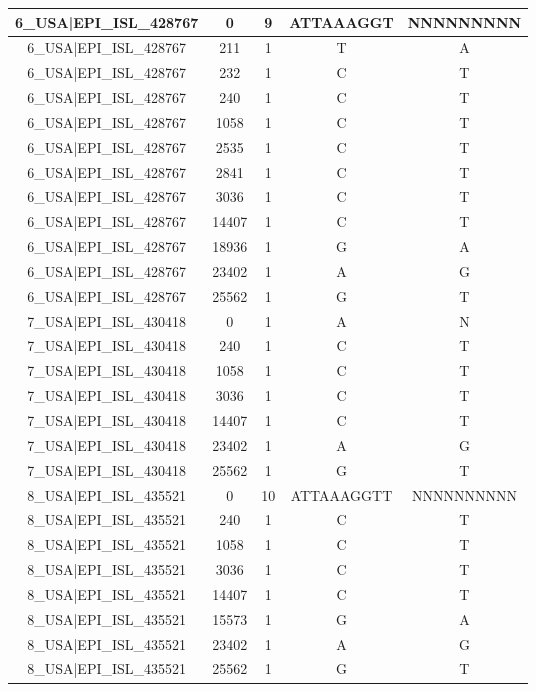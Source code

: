 \documentclass[a4paper,10pt]{article}
\begin{document}
\begin{longtable}{@{}ccccc@{}}
6\_USA|EPI\_ISL\_428767 & 0 & 9 & ATTAAAGGT & NNNNNNNNN \\* \midrule
6\_USA|EPI\_ISL\_428767 & 211 & 1 & T & A \\* \midrule
6\_USA|EPI\_ISL\_428767 & 232 & 1 & C & T \\* \midrule
6\_USA|EPI\_ISL\_428767 & 240 & 1 & C & T \\* \midrule
6\_USA|EPI\_ISL\_428767 & 1058 & 1 & C & T \\* \midrule
6\_USA|EPI\_ISL\_428767 & 2535 & 1 & C & T \\* \midrule
6\_USA|EPI\_ISL\_428767 & 2841 & 1 & C & T \\* \midrule
6\_USA|EPI\_ISL\_428767 & 3036 & 1 & C & T \\* \midrule
6\_USA|EPI\_ISL\_428767 & 14407 & 1 & C & T \\* \midrule
6\_USA|EPI\_ISL\_428767 & 18936 & 1 & G & A \\* \midrule
6\_USA|EPI\_ISL\_428767 & 23402 & 1 & A & G \\* \midrule
6\_USA|EPI\_ISL\_428767 & 25562 & 1 & G & T \\* \midrule
7\_USA|EPI\_ISL\_430418 & 0 & 1 & A & N \\* \midrule
7\_USA|EPI\_ISL\_430418 & 240 & 1 & C & T \\* \midrule
7\_USA|EPI\_ISL\_430418 & 1058 & 1 & C & T \\* \midrule
7\_USA|EPI\_ISL\_430418 & 3036 & 1 & C & T \\* \midrule
7\_USA|EPI\_ISL\_430418 & 14407 & 1 & C & T \\* \midrule
7\_USA|EPI\_ISL\_430418 & 23402 & 1 & A & G \\* \midrule
7\_USA|EPI\_ISL\_430418 & 25562 & 1 & G & T \\* \midrule
8\_USA|EPI\_ISL\_435521 & 0 & 10 & ATTAAAGGTT & NNNNNNNNNN \\* \midrule
8\_USA|EPI\_ISL\_435521 & 240 & 1 & C & T \\* \midrule
8\_USA|EPI\_ISL\_435521 & 1058 & 1 & C & T \\* \midrule
8\_USA|EPI\_ISL\_435521 & 3036 & 1 & C & T \\* \midrule
8\_USA|EPI\_ISL\_435521 & 14407 & 1 & C & T \\* \midrule
8\_USA|EPI\_ISL\_435521 & 15573 & 1 & G & A \\* \midrule
8\_USA|EPI\_ISL\_435521 & 23402 & 1 & A & G \\* \midrule
8\_USA|EPI\_ISL\_435521 & 25562 & 1 & G & T \\* \midrule

\end{longtable}
\end{document}
